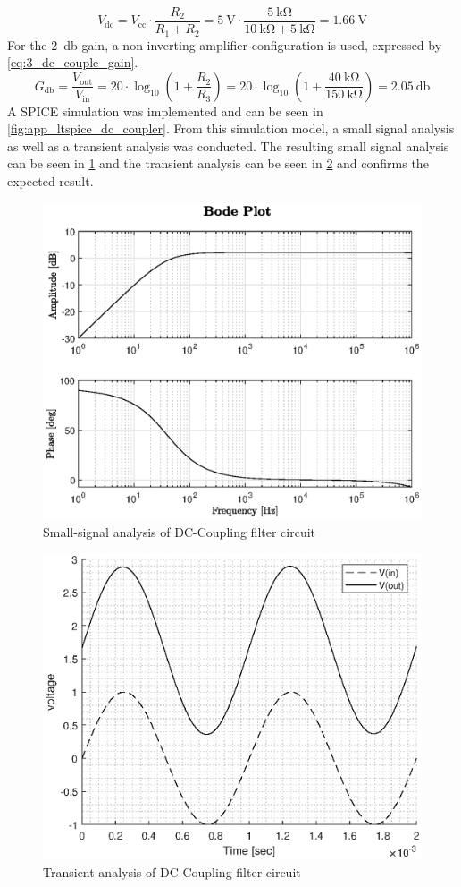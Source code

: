 \begin{equation} \label{eq:3_dc_couple_voltage}
	V_{\mathrm{dc}}= V_{\mathrm{cc}} \cdot \frac{R_{2}}{R_{1}+R_{2}} = \qty{5}{\volt} \cdot \frac{\qty{5}{\kilo\ohm}}{\qty{10}{\kilo\ohm}+\qty{5}{\kilo\ohm}} = \qty{1.66}{\volt}
\end{equation}
For the \qty{2}{\decibel} gain, a non-inverting amplifier configuration is used, expressed by \cref{eq:3_dc_couple_gain}.
\begin{equation} \label{eq:3_dc_couple_gain}
	G_{\unit{\decibel}} = \frac{V_{\mathrm{out}}}{V_{\mathrm{in}}} = 20\cdot \log_{10} \left(1 + \frac{R_2}{R_3} \right) = 20\cdot \log_{10} \left( 1 + \frac{\qty{40}{\kilo\ohm}}{\qty{150}{\kilo\ohm}} \right) = \qty{2.05}{\decibel}
\end{equation}
A SPICE simulation was implemented and can be seen in \cref{fig:app_ltspice_dc_coupler}. From this simulation model, a small signal analysis as well as a transient analysis was conducted. The resulting small signal analysis can be seen in \cref{fig:3_dccoupler_sim_ac} and the transient analysis can be seen in \cref{fig:3_dccoupler_sim_transient} and confirms the expected result.
\begin{figure}[htbp]
	\centering
	\includegraphics[width=.8\textwidth]{Figures/3_dc_coupler_sim.eps}
	\caption{Small-signal analysis of DC-Coupling filter circuit}
	\label{fig:3_dccoupler_sim_ac}
\end{figure}
\begin{figure}[htbp]
	\centering
	\includegraphics[width=.8\textwidth]{Figures/3_dc_coupler_sim_transient.eps}
	\caption{Transient analysis of DC-Coupling filter circuit}
	\label{fig:3_dccoupler_sim_transient}
\end{figure}
